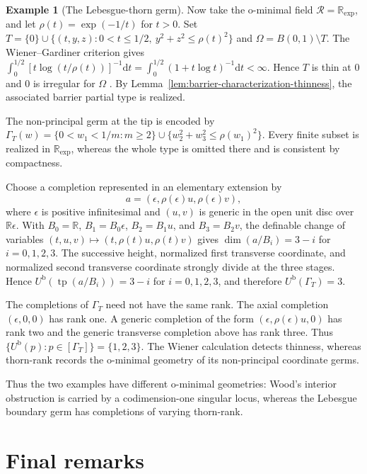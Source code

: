 \documentclass{amsart}
\theoremstyle{definition}
\newtheorem{example}{Example}[section]
\theoremstyle{remark}
\numberwithin{equation}{section}
\begin{document}
\begin{example}[The Lebesgue-thorn germ]
\label{ex:Lebesgue-Rexp-thorn}
Now take the o-minimal field $\mathcal R=\mathbb R_{\exp}$, and let
$\rho(t)=\exp(-1/t)$ for $t>0$.  Set $T=\{0\}\cup
\{(t,y,z):0<t\le1/2,\ y^2+z^2\le\rho(t)^2\}$
and $\Omega=B(0,1)\setminus T$.
The Wiener--Gardiner criterion gives
$\int_0^{1/2}[t\log(t/\rho(t))]^{-1}\mathrm{d}t
=\int_0^{1/2}(1+t\log t)^{-1}\mathrm{d}t<\infty$.
Hence $T$ is thin at $0$ and $0$ is irregular for $\Omega$
\cite[Theorem~1 and p.~239]{Gardiner1992FineLimit}.  By
Lemma~\ref{lem:barrier-characterization-thinness}, the associated barrier
partial type is realized.

The non-principal germ at the tip is encoded by $\Gamma_T(w)=
\{0<w_1<1/m:m\ge2\}
\cup
\{w_2^2+w_3^2\le\rho(w_1)^2\}.$
Every finite subset is realized in $\mathbb R_{\exp}$, whereas the whole
type is omitted there and is consistent by compactness.

Choose a completion represented in an elementary extension by
$$a=(\epsilon,\rho(\epsilon)u,\rho(\epsilon)v),$$
where $\epsilon$ is positive infinitesimal and $(u,v)$ is generic in the open unit disc over
$\mathbb R\epsilon$. With
$B_0=\mathbb R$, $B_1=B_0\epsilon$, $B_2=B_1u$, and $B_3=B_2v$, the
definable change of variables
$(t,u,v)\mapsto(t,\rho(t)u,\rho(t)v)$ gives $\dim(a/B_i)=3-i$ for $i=0,1,2,3$.
The successive height, normalized first transverse coordinate, and normalized
second transverse coordinate strongly divide at the three stages. Hence $U^{\mathrm b}(\operatorname{tp}(a/B_i))=3-i$ for $i=0,1,2,3$,
and therefore $U^{\mathrm b}(\Gamma_T)=3$.

The completions of $\Gamma_T$ need not have the same rank. The axial
completion $(\epsilon,0,0)$ has rank one. A generic completion of the form
$(\epsilon,\rho(\epsilon)u,0)$ has rank two and the generic transverse
completion above has rank three. Thus $\{U^{\mathrm b}(p):p\in[\Gamma_T]\}=\{1,2,3\}$.
The Wiener calculation detects thinness, whereas thorn-rank records the
o-minimal geometry of its non-principal coordinate germs. %
\end{example}

Thus the two examples have different o-minimal geometries: Wood's
interior obstruction is carried by a codimension-one singular locus,
whereas the Lebesgue boundary germ has completions of varying
thorn-rank.

\section*{Final remarks}
\end{document}
